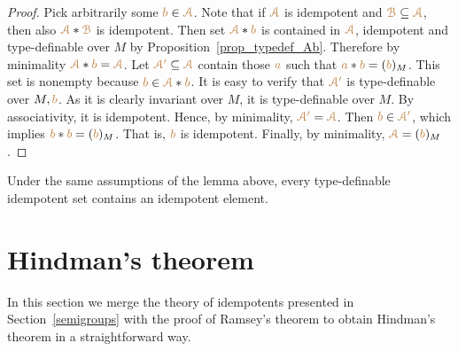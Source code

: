 \begin{proof}
Pick arbitrarily some ${\color{brown} b}\in{\color{brown}\EuScript A}$.
Note that if ${\color{brown}\EuScript A}$ is idempotent and ${\color{brown}\EuScript B}\subseteq{\color{brown}\EuScript A}$, then also ${\color{brown}\EuScript A}*{\color{brown}\EuScript B}$ is idempotent.
%
Then set ${\color{brown}\EuScript A}*{\color{brown} b}$ is contained in ${\color{brown}\EuScript A}$, idempotent and 
type-definable over $M$ by Proposition~\ref{prop_typedef_Ab}.
%
Therefore by minimality ${\color{brown}\EuScript A}*{\color{brown} b}={\color{brown}\EuScript A}$.
%
Let ${\color{brown}\EuScript A'}\subseteq{\color{brown}\EuScript A}$ contain those ${\color{brown} a}$ such that 
${\color{brown} a}*{\color{brown} b}=({\color{brown} b})_M$.
%
This set is nonempty because ${\color{brown} b}\in{\color{brown}\EuScript A}*{\color{brown} b}$.
%
It is easy to verify that ${\color{brown}\EuScript A'}$ is type-definable over $M,{\color{brown} b}$.
%
As it is clearly invariant over $M$, it is type-definable over $M$.
%
By associativity, it is idempotent.
%
Hence, by minimality, ${\color{brown}\EuScript A'}={\color{brown}\EuScript A}$.
%
Then ${\color{brown} b}\in{\color{brown}\EuScript A'}$, which implies ${\color{brown} b}*{\color{brown} b}=({\color{brown} b})_M$.
%
That is, ${\color{brown} b}$ is idempotent.
%
Finally, by minimality, ${\color{brown}\EuScript A}=({\color{brown} b})_M$.
\end{proof}

\begin{corollary}\label{corol_idempotent}
Under the same assumptions of the lemma above, every type-definable 
idempotent set contains an idempotent element.
\end{corollary}


\section{Hindman's theorem}\label{Hindman}

In this section we merge the theory of idempotents presented in Section~\ref{semigroups}
with the proof of Ramsey's theorem to obtain Hindman's theorem in a straightforward way.

